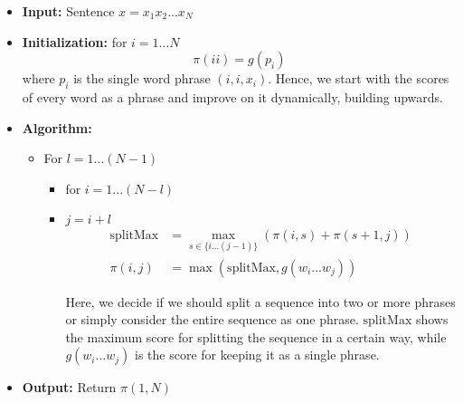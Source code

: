 \documentclass[11pt]{scrartcl}
\begin{document}
\begin{itemize}
\item \textbf{Input:} Sentence $x = x_1 x_2 ... x_N$
\item \textbf{Initialization:} for $i=1...N$
\[\pi(ii) = g(p_i)\]
where $p_i$ is the single word phrase $(i, i, x_i)$. Hence, we start with the scores of every word as a phrase and improve on it dynamically, building upwards. 
\item \textbf{Algorithm:}
\begin{itemize}

\item For $l = 1 ... (N-1)$

\begin{itemize}
\item for $i = 1 ... (N-l)$
\item $j = i + l$
\begin{align*}
\text{splitMax} &= \max_{s \in \{i ... (j-1)\}} \left( \pi(i, s) + \pi(s+1, j)\right) \\
\pi(i, j) &= \max (\text{splitMax}, g(w_i ... w_j))
\end{align*}

Here, we decide if we should split a sequence into two or more phrases or simply consider the entire sequence as one phrase. $\text{splitMax}$ shows the maximum score for splitting the sequence in a certain way, while $g(w_i ... w_j)$ is the score for keeping it as a single phrase. 
\end{itemize}
\end{itemize}
\item \textbf{Output:} Return $\pi(1, N)$

\end{itemize}
\end{document}
